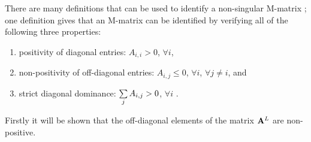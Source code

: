 \begin{prf}
  There are many definitions that can be used to identify a non-singular M-matrix
  \cite{m_matrix_fiedler}; one
  definition gives that an M-matrix can be identified by verifying all of the
  following three properties:
  \begin{enumerate}
    \item positivity of diagonal entries: $A_{i,i} > 0$, $\forall i$,
    \item non-positivity of off-diagonal entries: $A_{i,j} \leq 0$,
      $\forall i$, $\forall j\ne i$, and
    \item strict diagonal dominance: $\sum\limits_j A_{i,j} > 0$, $\forall i$ \cite{m_matrix_poole}.
  \end{enumerate}


Firstly it will be shown that the off-diagonal elements of the matrix
$\mathbf{A}^L$ are non-positive.


\end{prf}

